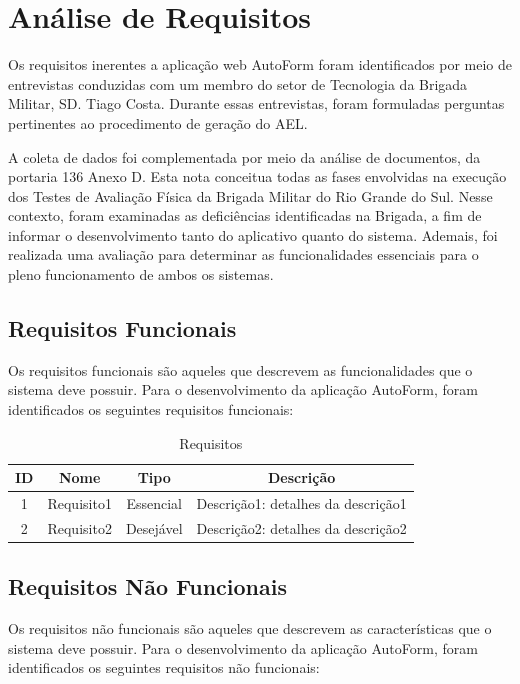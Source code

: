 \section{Análise de Requisitos}
Os requisitos inerentes a aplicação web AutoForm foram identificados por meio de entrevistas conduzidas com um membro do setor de Tecnologia da Brigada Militar, SD. Tiago Costa. Durante essas entrevistas, foram formuladas perguntas pertinentes ao procedimento de geração do AEL.

A coleta de dados foi complementada por meio da análise de documentos, da portaria 136 Anexo D. Esta nota conceitua todas as fases envolvidas na execução dos Testes de Avaliação Física da Brigada Militar do Rio Grande do Sul. Nesse contexto, foram examinadas as deficiências identificadas na Brigada, a fim de informar o desenvolvimento tanto do aplicativo quanto do sistema. Ademais, foi realizada uma avaliação para determinar as funcionalidades essenciais para o pleno funcionamento de ambos os sistemas.

\subsection{Requisitos Funcionais}
Os requisitos funcionais são aqueles que descrevem as funcionalidades que o sistema deve possuir. Para o desenvolvimento da aplicação AutoForm, foram identificados os seguintes requisitos funcionais:

\begin{table}[h]
    \centering
    \begin{tabular}{|c|c|c|c|}
    \hline
    \rowcolor{gray!50}
    ID & Nome & Tipo & Descrição \\
    \hline
    1 & Requisito1 & Essencial & \begin{minipage}[t]{0.4\textwidth}Descrição1: detalhes da descrição1\end{minipage} \\
    2 & Requisito2 & Desejável & \begin{minipage}[t]{0.4\textwidth}Descrição2: detalhes da descrição2\end{minipage} \\
    \hline
    \end{tabular}
    \caption{Requisitos}
    \label{tab:my_label}
    \end{table}

\subsection{Requisitos Não Funcionais}
Os requisitos não funcionais são aqueles que descrevem as características que o sistema deve possuir. Para o desenvolvimento da aplicação AutoForm, foram identificados os seguintes requisitos não funcionais:

